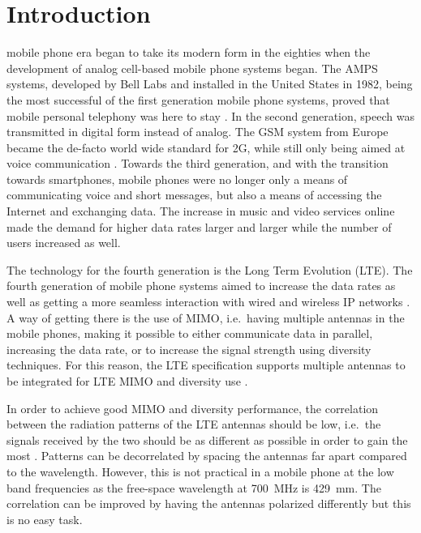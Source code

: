 \section{Introduction}
\label{cha:intro}

 mobile phone era began to take its modern form in the eighties when the development of analog cell-based mobile phone systems began. The AMPS systems, developed by Bell Labs and installed in the United States in 1982, being the most successful of the first generation mobile phone systems, proved that mobile personal telephony was here to stay \cite{tanenbaum2012computer}. In the second generation, speech was transmitted in digital form instead of analog. The GSM system from Europe became the de-facto world wide standard for 2G, while still only being aimed at voice communication \cite{tanenbaum2012computer}. Towards the third generation, and with the transition towards smartphones, mobile phones were no longer only a means of communicating voice and short messages, but also a means of accessing the Internet and exchanging data. The increase in music and video services online made the demand for higher data rates larger and larger while the number of users increased as well.

The technology for the fourth generation is the Long Term Evolution (LTE). The fourth generation of mobile phone systems aimed to increase the data rates as well as getting a more seamless interaction with wired and wireless IP networks \cite{tanenbaum2012computer}. A way of getting there is the use of MIMO, i.e.\ having multiple antennas in the mobile phones, making it possible to either communicate data in parallel, increasing the data rate, or to increase the signal strength using diversity techniques. For this reason, the LTE specification supports multiple antennas to be integrated for LTE MIMO and diversity use \cite{holma2011lte}.

In order to achieve good MIMO and diversity performance, the correlation between the radiation patterns of the LTE antennas should be low, i.e.\ the signals received by the two should be as different as possible in order to gain the most \cite{Tim2012Practical}. Patterns can be decorrelated by spacing the antennas far apart compared to the wavelength. However, this is not practical in a mobile phone at the low band frequencies as the free-space wavelength at \SI{700}{MHz} is \SI{429}{mm}. The correlation can be improved by having the antennas polarized differently but this is no easy task.

